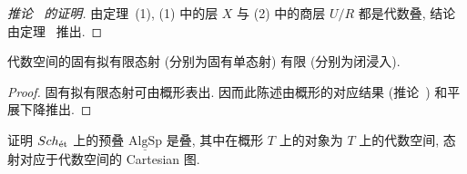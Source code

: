 \begin{proof}[推论~ 的证明]
由定理~(1), (1) 中的层 $X$ 与 (2) 中的商层 $U/R$ 都是代数叠, 结论由定理~ 推出.
\end{proof}
\begin{corollary}\label{src:5.5.14}
代数空间的固有拟有限态射 (分别为固有单态射) 有限 (分别为闭浸入).
\end{corollary}
\begin{proof}
固有拟有限态射可由概形表出. 因而此陈述由概形的对应结果 (推论~) 和平展下降推出.
\end{proof}
\begin{exercise}\label{src:5.5.15}
证明 $Sch_{\text{ét}}$ 上的预叠 $\underline{\mathrm{AlgSp}}$ 是叠, 其中在概形 $T$ 上的对象为 $T$ 上的代数空间, 态射对应于代数空间的 Cartesian 图.
\end{exercise}

